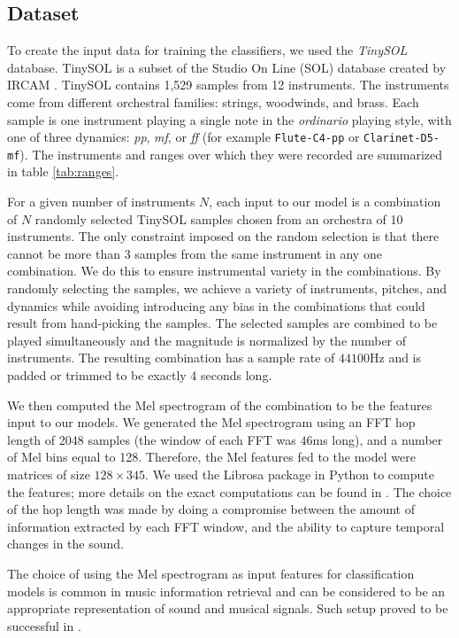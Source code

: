 \documentclass[runningheads,a4paper]{llncs}
\begin{document}
\subsection{Dataset}
\label{sec:dataset}

To create the input data for training the classifiers, we used the \emph{TinySOL} database. TinySOL is a subset of the Studio On Line (SOL) database created by IRCAM \cite{Cella2020b}. TinySOL contains 1,529 samples from 12 instruments. The instruments come from different orchestral families: strings, woodwinds, and brass. Each sample is one instrument playing a single note in the \emph{ordinario} playing style, with one of three dynamics: \textit{pp}, \textit{mf}, or \textit{ff} (for example \texttt{Flute-C4-pp} or \texttt{Clarinet-D5-mf}). The instruments and ranges over which they were recorded are summarized in table \ref{tab:ranges}.

For a given number of instruments $N$, each input to our model is a combination of $N$ randomly selected TinySOL samples chosen from an orchestra of 10 instruments. The only constraint imposed on the random selection is that there cannot be more than 3 samples from the same instrument in any one combination. We do this to ensure instrumental variety in the combinations. By randomly selecting the samples, we achieve a variety of instruments, pitches, and dynamics while avoiding introducing any bias in the combinations that could result from hand-picking the samples. The selected samples are combined to be played simultaneously and the magnitude is normalized by the number of instruments. The resulting combination has a sample rate of $44100$Hz and is padded or trimmed to be exactly 4 seconds long.

We then computed the Mel spectrogram of the combination to be the features input to our models. We generated the Mel spectrogram using an FFT hop length of 2048 samples (the window of each FFT was $46$ms long), and a number of Mel bins equal to 128. Therefore, the Mel features fed to the model were matrices of size $128\times 345$. We used the Librosa package in Python to compute the features; more details on the exact computations can be found in \cite{mcfee15}. The choice of the hop length was made by doing a compromise between the amount of information extracted by each FFT window, and the ability to capture temporal changes in the sound.

The choice of using the Mel spectrogram as input features for classification models is common in music information retrieval \cite{McKinney2003} and can be considered to be an appropriate representation of sound and musical signals. Such setup proved to be successful in \cite{Salamon17}.
\end{document}
